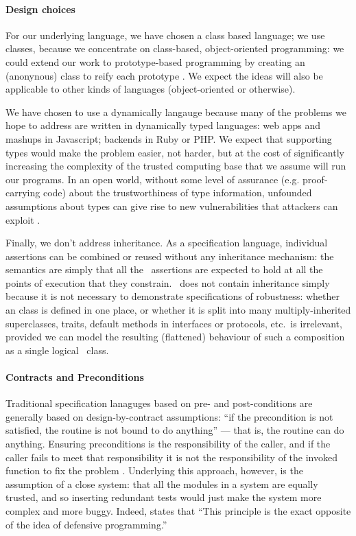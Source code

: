 
\paragraph{Design choices}

For our underlying language, we have chosen a class based language; we
use classes, because we concentrate on class-based, object-oriented
programming: we could extend our work to prototype-based programming
by creating an (anonynous) class to reify each
prototype \cite{graceClasses}. We expect the ideas will also be
applicable to other kinds of languages (object-oriented or
otherwise).

We have chosen to use a dynamically langauge because many of the
problems we hope to address are written in dynamically typed
languages: web apps and mashups in Javascript; backends in Ruby or
PHP.  We expect that supporting types would make the problem easier,
not harder, but at the cost of significantly increasing the complexity
of the trusted computing base that we assume will run our programs. In
an open world, without some level of assurance (e.g. proof-carrying
code) about the trustworthiness of type information, unfounded
assumptions about types can give rise to new vulnerabilities that
attackers can exploit \cite{pickles}.

Finally, we don't address inheritance. As a specification language,
individual \Chainmail assertions can be combined or reused without any
inheritance mechanism: the semantics are simply that all
the \Chainmail\ assertions are expected to hold at all the points of
execution that they constrain.  \LangOO\ does not contain inheritance
simply because it is not necessary to demonstrate specifications of
robustness: whether an \LangOO class is defined in one place, or
whether it is split into many multiply-inherited superclasses, traits,
default methods in interfaces or protocols, etc.\ is irrelevant,
provided we can model the resulting (flattened) behaviour of such a
composition as a single logical \LangOO\ class.

\paragraph{Contracts and Preconditions}

Traditional specification lanaguges based on pre- and post-conditions
are generally based on design-by-contract assumptions: ``if the
precondition is not satisfied, the routine is not bound to do
anything'' \cite{meyer92dbc} --- that is, the routine can do
anything. Ensuring preconditions is the responsibility of the caller,
and if the caller fails to meet that responsibility it is not the
responsibility of the invoked function to fix the problem \cite{Mey88}.
Underlying this approach, however, is the assumption of a close
system: that all the modules in a system are equally trusted, and so
inserting redundant tests would just make the system more complex and
more buggy. Indeed, \citet{meyer92dbc} states that ``This principle is
the exact opposite of the idea of defensive programming.''

